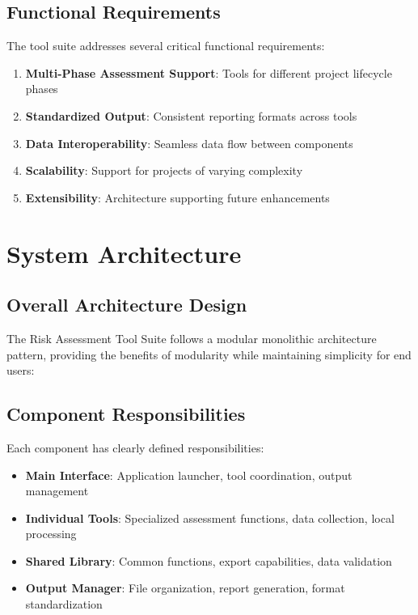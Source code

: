 \documentclass[binding=0.6cm]{sapthesis}
\begin{document}
\subsection{Functional Requirements}

The tool suite addresses several critical functional requirements:

\begin{enumerate}
    \item \textbf{Multi-Phase Assessment Support}: Tools for different project lifecycle phases
    \item \textbf{Standardized Output}: Consistent reporting formats across tools
    \item \textbf{Data Interoperability}: Seamless data flow between components
    \item \textbf{Scalability}: Support for projects of varying complexity
    \item \textbf{Extensibility}: Architecture supporting future enhancements
\end{enumerate}

\section{System Architecture}

\subsection{Overall Architecture Design}

The Risk Assessment Tool Suite follows a modular monolithic architecture pattern, providing the benefits of modularity while maintaining simplicity for end users:

\subsection{Component Responsibilities}

Each component has clearly defined responsibilities:

\begin{itemize}
    \item \textbf{Main Interface}: Application launcher, tool coordination, output management
    \item \textbf{Individual Tools}: Specialized assessment functions, data collection, local processing
    \item \textbf{Shared Library}: Common functions, export capabilities, data validation
    \item \textbf{Output Manager}: File organization, report generation, format standardization
\end{itemize}
\end{document}
